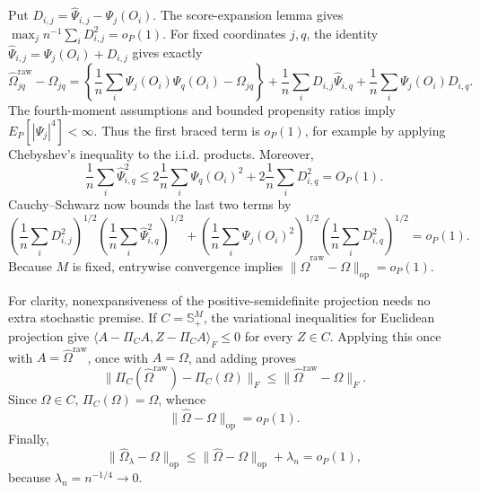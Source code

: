 Put \(D_{i,j}=\widehat\Psi_{i,j}-\Psi_j(O_i)\).  The score-expansion lemma gives
\(\max_j n^{-1}\sum_iD_{i,j}^2=o_P(1)\).  For fixed coordinates \(j,q\), the identity \(\widehat\Psi_{i,j}=\Psi_j(O_i)+D_{i,j}\) gives exactly
\[
 \widehat\Omega^{\mathrm{raw}}_{jq}-\Omega_{jq}
 =\left\{\frac1n\sum_i\Psi_j(O_i)\Psi_q(O_i)-\Omega_{jq}\right\}
  +\frac1n\sum_iD_{i,j}\widehat\Psi_{i,q}
  +\frac1n\sum_i\Psi_j(O_i)D_{i,q}.
\]
The fourth-moment assumptions and bounded propensity ratios imply \(E_P[|\Psi_j|^4]<\infty\).  Thus the first braced term is \(o_P(1)\), for example by applying Chebyshev's inequality to the i.i.d. products.  Moreover,
\[
 \frac1n\sum_i\widehat\Psi_{i,q}^2
 \le 2\frac1n\sum_i\Psi_q(O_i)^2+2\frac1n\sum_iD_{i,q}^2=O_P(1).
\]
Cauchy--Schwarz now bounds the last two terms by
\[
 \left(\frac1n\sum_iD_{i,j}^2\right)^{1/2}
 \left(\frac1n\sum_i\widehat\Psi_{i,q}^2\right)^{1/2}
 +
 \left(\frac1n\sum_i\Psi_j(O_i)^2\right)^{1/2}
 \left(\frac1n\sum_iD_{i,q}^2\right)^{1/2}=o_P(1).
\]
Because \(M\) is fixed, entrywise convergence implies
\(\|\widehat\Omega^{\mathrm{raw}}-\Omega\|_{\mathrm{op}}=o_P(1)\).

For clarity, nonexpansiveness of the positive-semidefinite projection needs no extra stochastic premise.  If \(C=\mathbb S_+^M\), the variational inequalities for Euclidean projection give
\(\langle A-\Pi_C A,Z-\Pi_C A\rangle_F\le0\) for every \(Z\in C\).  Applying this once with \(A=\widehat\Omega^{\mathrm{raw}}\), once with \(A=\Omega\), and adding proves
\[
 \|\Pi_C(\widehat\Omega^{\mathrm{raw}})-\Pi_C(\Omega)\|_F
 \le \|\widehat\Omega^{\mathrm{raw}}-\Omega\|_F.
\]
Since \(\Omega\in C\), \(\Pi_C(\Omega)=\Omega\), whence
\[
 \|\widehat\Omega-\Omega\|_{\mathrm{op}}=o_P(1).
\]
Finally,
\[
 \|\widehat\Omega_\lambda-\Omega\|_{\mathrm{op}}
 \le \|\widehat\Omega-\Omega\|_{\mathrm{op}}+\lambda_n=o_P(1),
\]
because \(\lambda_n=n^{-1/4}\to0\).
